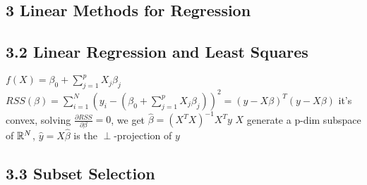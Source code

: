 \documentclass[9pt]{extarticle}
\begin{document}
\begin{multicols*}{2}
\section*{3 Linear Methods for Regression}

\subsection*{3.2 Linear Regression and Least Squares}

$f(X)=\beta_0+\sum_{j=1}^{p}X_j \beta_j$\nl
$RSS(\beta)=\sum_{i=1}^{N}(y_i-(\beta_0+\sum_{j=1}^{p}X_j \beta_j))^2=(y-X\beta)^T(y-X\beta)$\nl
it's convex, solving $\frac{\partial RSS}{\partial \beta}=0$, we get $\hat{\beta}=(X^TX)^{-1}X^Ty$\nl
$X$ generate a p-dim subspace of $\mathbb{R}^N$, $\hat{y}=X\hat{\beta}$ is the $\perp$-projection of $y$



\subsection*{3.3 Subset Selection}

\end{multicols*}
\end{document}
